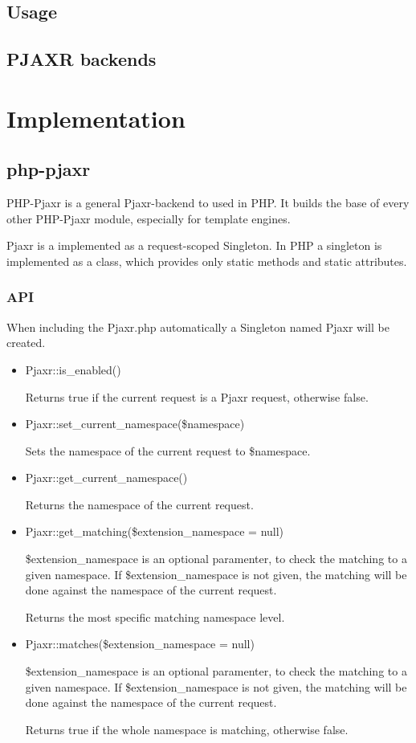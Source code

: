 \documentclass[f,bachelor,binding,twoside,palatino]{WeSTthesis}
\def \pjaxr {PJAXR}
\def \phpPjaxr {php-pjaxr}
\begin{document}
\subsection{Usage}

\subsection{\pjaxr{} backends}

\section{Implementation}

\subsection{\phpPjaxr{}}
PHP-Pjaxr is a general Pjaxr-backend to used in PHP.
It builds the base of every other PHP-Pjaxr module, especially for template engines.

Pjaxr is a implemented as a request-scoped Singleton.
In PHP a singleton is implemented as a class, which provides only static methods and static attributes.

\subsubsection{API}

When including the Pjaxr.php automatically a Singleton named Pjaxr will be created.
\begin{itemize}
\item Pjaxr::is\_enabled()

Returns true if the current request is a Pjaxr request, otherwise false.
\item Pjaxr::set\_current\_namespace(\$namespace)

Sets the namespace of the current request to \$namespace.
\item Pjaxr::get\_current\_namespace()

Returns the namespace of the current request.
\item Pjaxr::get\_matching(\$extension\_namespace = null)

\$extension\_namespace is an optional paramenter, to check the matching to a given namespace. If \$extension\_namespace is not given, the matching will be done against the namespace of the current request.

Returns the most specific matching namespace level.
\item Pjaxr::matches(\$extension\_namespace = null)

\$extension\_namespace is an optional paramenter, to check the matching to a given namespace. If \$extension\_namespace is not given, the matching will be done against the namespace of the current request.

Returns true if the whole namespace is matching, otherwise false.
\end{itemize}
    
\end{document}
